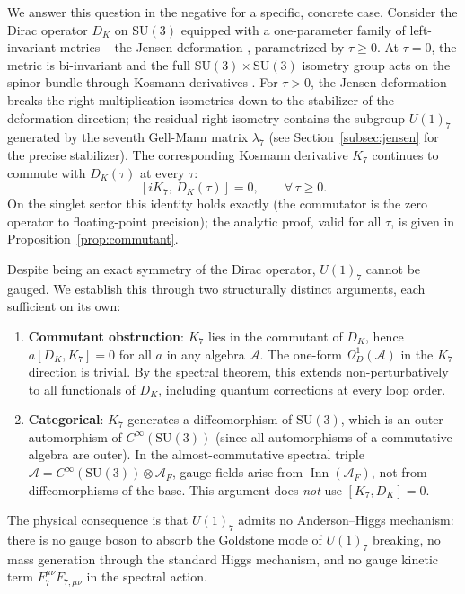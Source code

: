 \documentclass[12pt]{article}
\theoremstyle{definition}
\theoremstyle{remark}
\newcommand{\Alg}{\mathcal{A}}
\newcommand{\Inn}{\operatorname{Inn}}
\begin{document}
We answer this question in the negative for a specific, concrete case.  Consider the Dirac operator $D_K$ on $\mathrm{SU}(3)$ equipped with a one-parameter family of left-invariant metrics -- the Jensen deformation \cite{Jensen1973}, parametrized by $\tau \geq 0$.  At $\tau = 0$, the metric is bi-invariant and the full $\mathrm{SU}(3) \times \mathrm{SU}(3)$ isometry group acts on the spinor bundle through Kosmann derivatives \cite{Kosmann1971}.  For $\tau > 0$, the Jensen deformation breaks the right-multiplication isometries down to the stabilizer of the deformation direction; the residual right-isometry contains the subgroup $U(1)_7$ generated by the seventh Gell-Mann matrix $\lambda_7$ (see Section~\ref{subsec:jensen} for the precise stabilizer).  The corresponding Kosmann derivative $K_7$ continues to commute with $D_K(\tau)$ at every $\tau$:
\begin{equation}\label{eq:commutant}
  [iK_7, \, D_K(\tau)] = 0, \qquad \forall\, \tau \geq 0.
\end{equation}
On the singlet sector this identity holds exactly (the commutator is the zero operator to floating-point precision); the analytic proof, valid for all $\tau$, is given in Proposition~\ref{prop:commutant}.

Despite being an exact symmetry of the Dirac operator, $U(1)_7$ cannot be gauged.  We establish this through two structurally distinct arguments, each sufficient on its own:

\begin{enumerate}
  \item \textbf{Commutant obstruction}: $K_7$ lies in the commutant of $D_K$, hence $a[D_K, K_7] = 0$ for all $a$ in any algebra $\Alg$.  The one-form $\Omega^1_D(\Alg)$ in the $K_7$ direction is trivial.  By the spectral theorem, this extends non-perturbatively to all functionals of $D_K$, including quantum corrections at every loop order.

  \item \textbf{Categorical}: $K_7$ generates a diffeomorphism of $\mathrm{SU}(3)$, which is an outer automorphism of $C^\infty(\mathrm{SU}(3))$ (since all automorphisms of a commutative algebra are outer).  In the almost-commutative spectral triple $\Alg = C^\infty(\mathrm{SU}(3)) \otimes \Alg_F$, gauge fields arise from $\Inn(\Alg_F)$, not from diffeomorphisms of the base.  This argument does \emph{not} use $[K_7, D_K] = 0$.
\end{enumerate}

The physical consequence is that $U(1)_7$ admits no Anderson--Higgs mechanism: there is no gauge boson to absorb the Goldstone mode of $U(1)_7$ breaking, no mass generation through the standard Higgs mechanism, and no gauge kinetic term $F_7^{\mu\nu} F_{7,\mu\nu}$ in the spectral action.
\end{document}
